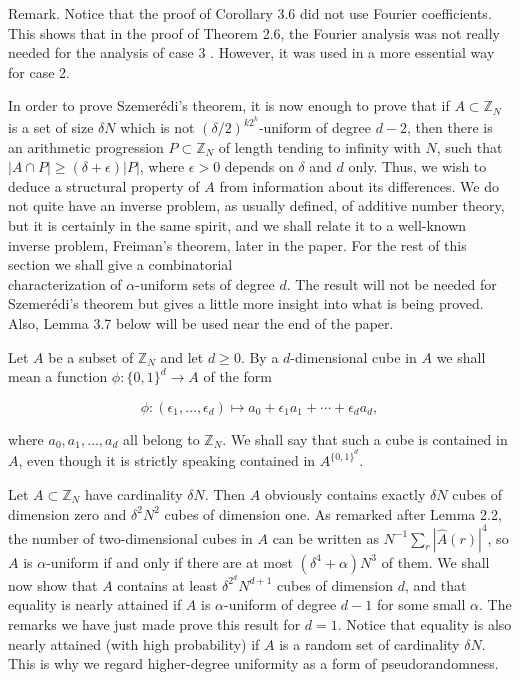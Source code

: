 \documentclass[10pt]{article}
\begin{document}
Remark. Notice that the proof of Corollary 3.6 did not use Fourier coefficients. This shows that in the proof of Theorem 2.6, the Fourier analysis was not really needed for the analysis of case 3 . However, it was used in a more essential way for case 2.

In order to prove Szemerédi's theorem, it is now enough to prove that if $A \subset \mathbb{Z}_{N}$ is a set of size $\delta N$ which is not $(\delta / 2)^{k 2^{k}}$-uniform of degree $d-2$, then there is an arithmetic progression $P \subset \mathbb{Z}_{N}$ of length tending to infinity with $N$, such that $|A \cap P| \geqslant(\delta+\epsilon)|P|$, where $\epsilon>0$ depends on $\delta$ and $d$ only. Thus, we wish to deduce a structural property of $A$ from information about its differences. We do not quite have an inverse problem, as usually defined, of additive number theory, but it is certainly in the same spirit, and we shall relate it to a well-known inverse problem, Freiman's theorem, later in the paper. For the rest of this section we shall give a combinatorial\\
characterization of $\alpha$-uniform sets of degree $d$. The result will not be needed for Szemerédi's theorem but gives a little more insight into what is being proved. Also, Lemma 3.7 below will be used near the end of the paper.

Let $A$ be a subset of $\mathbb{Z}_{N}$ and let $d \geqslant 0$. By a $d$-dimensional cube in $A$ we shall mean a function $\phi:\{0,1\}^{d} \rightarrow A$ of the form

$$
\phi:\left(\epsilon_{1}, \ldots, \epsilon_{d}\right) \mapsto a_{0}+\epsilon_{1} a_{1}+\cdots+\epsilon_{d} a_{d},
$$

where $a_{0}, a_{1}, \ldots, a_{d}$ all belong to $\mathbb{Z}_{N}$. We shall say that such a cube is contained in $A$, even though it is strictly speaking contained in $A^{\{0,1\}^{d}}$.

Let $A \subset \mathbb{Z}_{N}$ have cardinality $\delta N$. Then $A$ obviously contains exactly $\delta N$ cubes of dimension zero and $\delta^{2} N^{2}$ cubes of dimension one. As remarked after Lemma 2.2, the number of two-dimensional cubes in $A$ can be written as $N^{-1} \sum_{r}|\hat{A}(r)|^{4}$, so $A$ is $\alpha$-uniform if and only if there are at most $\left(\delta^{4}+\alpha\right) N^{3}$ of them. We shall now show that $A$ contains at least $\delta^{2^{d}} N^{d+1}$ cubes of dimension $d$, and that equality is nearly attained if $A$ is $\alpha$-uniform of degree $d-1$ for some small $\alpha$. The remarks we have just made prove this result for $d=1$. Notice that equality is also nearly attained (with high probability) if $A$ is a random set of cardinality $\delta N$. This is why we regard higher-degree uniformity as a form of pseudorandomness.
\end{document}
